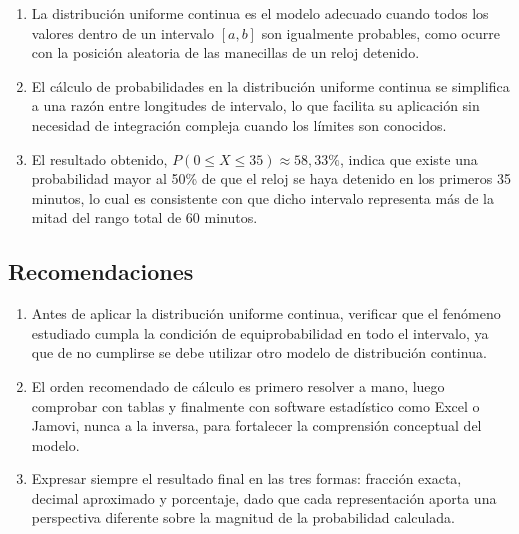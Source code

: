 \documentclass[12pt,a4paper]{article}
\begin{document}
	\begin{enumerate}[leftmargin=1.5cm, label=\textbf{\arabic*.}, itemsep=6pt]
		\item La distribución uniforme continua es el modelo adecuado cuando todos los valores dentro de un intervalo $[a, b]$ son igualmente probables, como ocurre con la posición aleatoria de las manecillas de un reloj detenido.
		
		\item El cálculo de probabilidades en la distribución uniforme continua se simplifica a una razón entre longitudes de intervalo, lo que facilita su aplicación sin necesidad de integración compleja cuando los límites son conocidos.
		
		\item El resultado obtenido, $P(0 \leq X \leq 35) \approx 58{,}33\%$, indica que existe una probabilidad mayor al 50\% de que el reloj se haya detenido en los primeros 35 minutos, lo cual es consistente con que dicho intervalo representa más de la mitad del rango total de 60 minutos.
	\end{enumerate}
	
	\vspace{0.3cm}
	
	\subsection{Recomendaciones}
	
	\begin{enumerate}[leftmargin=1.5cm, label=\textbf{\arabic*.}, itemsep=6pt]
		\item Antes de aplicar la distribución uniforme continua, verificar que el fenómeno estudiado cumpla la condición de equiprobabilidad en todo el intervalo, ya que de no cumplirse se debe utilizar otro modelo de distribución continua.
		
		\item El orden recomendado de cálculo es primero resolver a mano, luego comprobar con tablas y finalmente con software estadístico como Excel o Jamovi, nunca a la inversa, para fortalecer la comprensión conceptual del modelo.
		
		\item Expresar siempre el resultado final en las tres formas: fracción exacta, decimal aproximado y porcentaje, dado que cada representación aporta una perspectiva diferente sobre la magnitud de la probabilidad calculada.
	\end{enumerate}
	
\end{document}
